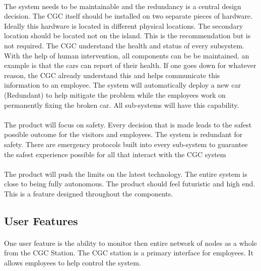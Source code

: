 \documentclass[12pt]{article}
\begin{document}
    \paragraph{} The system needs to be maintainable and the redundancy is a central design decision. The CGC itself should be installed on two separate pieces of hardware. Ideally this hardware is located in different physical locations. The secondary location should be located not on the island. This is the recommendation but is not required. The CGC understand the health and status of every subsystem. With the help of human intervention, all components can be be maintained. an example is that the cars can report of their health. If one goes down for whatever reason, the CGC already understand this and helps communicate this information to an employee. The system will automatically deploy a new car (Redundant) to help mitigate the problem while the employees work on permanently fixing the broken car. All sub-systems will have this capability.
    
    \paragraph{} The product will focus on safety. Every decision that is made leads to the safest possible outcome for the visitors and employees. The system is redundant for safety. There are emergency protocols built into every sub-system to guarantee the safest experience possible for all that interact with the CGC system 
        
    \paragraph{} The product will push the limits on the latest technology. The entire system is close to being fully autonomous. The product should feel futuristic and high end. This is a feature designed throughout the components.

    \subsection{User Features}
    \paragraph{} One user feature is the ability to monitor then entire network of nodes as a whole from the CGC Station. The CGC station is a primary interface for employees. It allows employees to help control the system.
        
\end{document}
